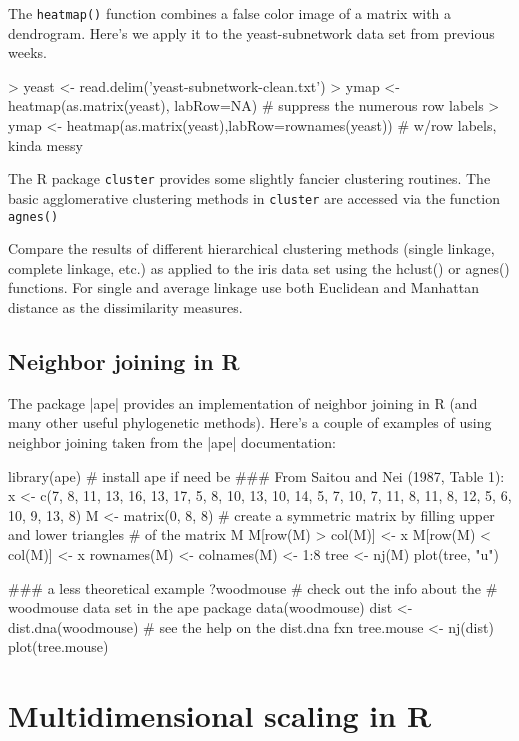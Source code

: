 The \texttt{heatmap()} function combines a false color image of a matrix with a dendrogram. Here's we apply it to the yeast-subnetwork data set from previous weeks.

\begin{R}
> yeast <- read.delim('yeast-subnetwork-clean.txt')
> ymap <- heatmap(as.matrix(yeast), labRow=NA) # suppress the numerous row labels
> ymap <- heatmap(as.matrix(yeast),labRow=rownames(yeast)) # w/row labels, kinda messy

\end{R}

The R package \texttt{cluster} provides some slightly fancier clustering routines. The basic agglomerative clustering methods in \texttt{cluster} are accessed via the function \texttt{agnes()} 

Compare the results of different hierarchical clustering methods (single linkage, complete linkage, etc.) as applied to the iris data set using the hclust() or agnes() functions. For single and average linkage use both Euclidean and Manhattan distance as the dissimilarity measures.

\subsection{Neighbor joining in R}

The package |ape| provides an implementation of neighbor joining in R (and many other useful phylogenetic methods). Here's a couple of examples of using neighbor joining taken from the |ape| documentation:

\begin{R}
library(ape) # install ape if need be
### From Saitou and Nei (1987, Table 1):
x <- c(7, 8, 11, 13, 16, 13, 17, 5, 8, 10, 13, 10, 14, 5, 7, 10, 7, 11, 8, 11, 8, 12, 5, 6, 10, 9, 13, 8)
M <- matrix(0, 8, 8)
# create a symmetric matrix by filling upper and lower triangles
# of the matrix M
M[row(M) > col(M)] <- x
M[row(M) < col(M)] <- x
rownames(M) <- colnames(M) <- 1:8
tree <- nj(M)
plot(tree, "u")

### a less theoretical example
?woodmouse  # check out the info about the 
            # woodmouse data set in the ape package
data(woodmouse)
dist <- dist.dna(woodmouse) # see the help on the dist.dna fxn
tree.mouse <- nj(dist)
plot(tree.mouse)
\end{R}


\section{Multidimensional scaling in R}

